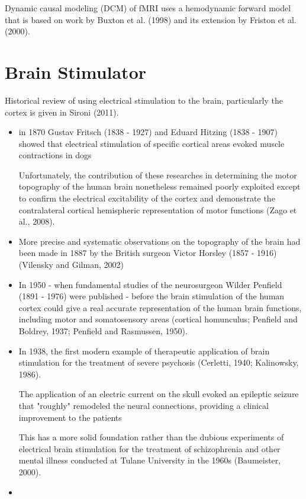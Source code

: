 Dynamic causal modeling (DCM) of fMRI uses a hemodynamic forward model that is
based on work by Buxton et al. (1998) and its extension by Friston et al.
(2000).



\chapter{Brain Stimulator}
\label{chap:brain-stimulator}


Historical review of using electrical stimulation to the brain, particularly the
cortex is given in Sironi (2011).
\begin{itemize}
  \item in 1870 Gustav Fritsch (1838 - 1927) and Eduard Hitzing (1838 - 1907) showed
  that electrical stimulation of specific cortical areas evoked muscle
  contractions in dogs 
  

Unfortunately, the contribution of these researches in determining the motor
topography of the human brain nonetheless remained poorly exploited except to
confirm the electrical excitability of the cortex and demonstrate the
contralateral cortical hemispheric representation of motor functions (Zago et
al., 2008).

  \item More precise and systematic observations on the topography of the brain
  had been made in 1887 by the British surgeon Victor Horsley (1857 - 1916)
  (Vilensky and Gilman, 2002) 
  
  \item In 1950  -  when fundamental studies of the neurosurgeon Wilder
  Penfield (1891 - 1976) were published  -  before the brain stimulation of the
  human cortex could give a real accurate representation of the human brain
  functions, including motor and somatosensory areas (cortical homunculus;
  Penfield and Boldrey, 1937; Penfield and Rasmussen, 1950).   
   
   \item In 1938, the first modern example of therapeutic application of brain
   stimulation for the treatment of severe psychosis (Cerletti, 1940;
   Kalinowsky, 1986).
   
   The application of an electric current on the skull evoked an epileptic
   seizure that "roughly" remodeled the neural connections, providing a clinical
   improvement to the patients 
   
   This has a more solid foundation rather than the dubious experiments of
   electrical brain stimulation for the treatment of schizophrenia and other
   mental illness conducted at Tulane University in the 1960s (Baumeister,
   2000).
   
   \item 
   
   
\end{itemize}


